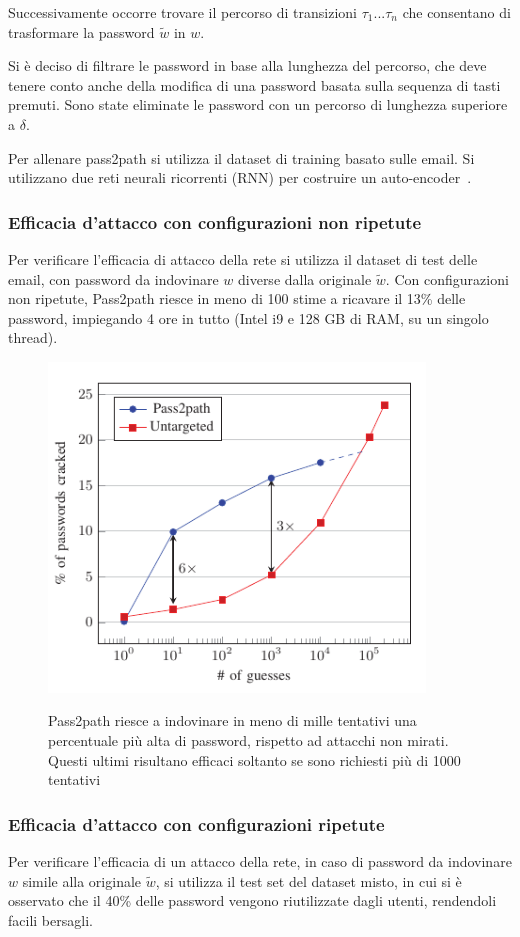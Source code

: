 Successivamente occorre trovare il percorso di transizioni  $\tau_1...\tau_n$ che consentano di trasformare la password $\tilde{w}$ in $w$.

Si è deciso di filtrare le password in base alla lunghezza del percorso, che deve tenere conto anche della modifica di una password basata sulla sequenza di tasti premuti. Sono state eliminate le password con un percorso di lunghezza superiore a $\delta$.

Per allenare pass2path si utilizza il dataset di training basato sulle email.
Si utilizzano due reti neurali ricorrenti (RNN) per costruire un auto-encoder~\cite{Sherstinsky_2020}.

\subsubsection{Efficacia d'attacco con configurazioni non ripetute}
Per verificare l'efficacia di attacco della rete si utilizza il dataset di test delle email, con password da indovinare $w$ diverse dalla originale $\tilde{w}$.
Con configurazioni non ripetute, Pass2path riesce in meno di 100 stime a ricavare
il 13\% delle password, impiegando 4 ore in tutto (Intel i9 e 128 GB di RAM, su un singolo thread).
\begin{figure}[h]
    \centering
    \includegraphics[width=10cm]{./immagini/pass2path.png}
    \label{pass2path}
    \caption{Pass2path riesce a indovinare in meno di mille tentativi una percentuale più alta di password, rispetto ad attacchi non mirati. Questi ultimi risultano efficaci soltanto se sono richiesti più di 1000 tentativi~\cite{biijeta}}
\end{figure}

\subsubsection{Efficacia d'attacco con configurazioni ripetute}
Per verificare l'efficacia di un attacco della rete, in caso di password da indovinare $w$ simile alla originale $\tilde{w}$, si utilizza il test set del dataset misto, in cui si è osservato che il 40\% delle password vengono riutilizzate dagli utenti, rendendoli facili bersagli.

